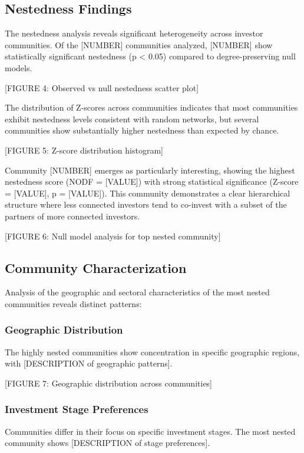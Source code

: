 \documentclass[12pt]{article}
\begin{document}
\subsection{Nestedness Findings}

The nestedness analysis reveals significant heterogeneity across investor communities. Of the [NUMBER] communities analyzed, [NUMBER] show statistically significant nestedness (p < 0.05) compared to degree-preserving null models.

[FIGURE 4: Observed vs null nestedness scatter plot]

The distribution of Z-scores across communities indicates that most communities exhibit nestedness levels consistent with random networks, but several communities show substantially higher nestedness than expected by chance.

[FIGURE 5: Z-score distribution histogram]

Community [NUMBER] emerges as particularly interesting, showing the highest nestedness score (NODF = [VALUE]) with strong statistical significance (Z-score = [VALUE], p = [VALUE]). This community demonstrates a clear hierarchical structure where less connected investors tend to co-invest with a subset of the partners of more connected investors.

[FIGURE 6: Null model analysis for top nested community]

\subsection{Community Characterization}

Analysis of the geographic and sectoral characteristics of the most nested communities reveals distinct patterns:

\subsubsection{Geographic Distribution}

The highly nested communities show concentration in specific geographic regions, with [DESCRIPTION of geographic patterns].

[FIGURE 7: Geographic distribution across communities]

\subsubsection{Investment Stage Preferences}

Communities differ in their focus on specific investment stages. The most nested community shows [DESCRIPTION of stage preferences].
\end{document}
